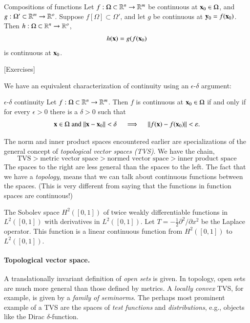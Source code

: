 \begin{myTheorem}{Compositions of functions}{}
Let $f : \Omega \subset \mathbb{R}^n \to \mathbb{R}^m$ be continuous at $\mathbf{x}_0\in \Omega$, and $g : \Omega' \subset \mathbb{R}^m \to \mathbb{R}^o$. Suppose $f[\Omega] \subset \Omega'$, and let $g$ be continuous at $\mathbf{y}_0 = f(\mathbf{x}_0)$. Then $h : \Omega\subset \mathbb{R}^n\to\mathbb{R}^o$,
\[ h(\mathbf{x}) = g(f(\mathbf{x}_0) \]
is continuous at $\mathbf{x}_0$.
\end{myTheorem}

[Exercises]

We have an equivalent characterization of continuity using an $\epsilon$-$\delta$ argument:
\begin{myTheorem}{$\epsilon$-$\delta$ continuity}{}
    Let $f : \Omega \subset \mathbb{R}^n \to \mathbb{R}^m$. Then $f$ is continuous at $\mathbf{x}_0 \in \Omega$ if and only if for every $\epsilon>0$ there is a $\delta > 0$ such that
    \begin{equation}
        \mathbf{x}\in\Omega \; \text{and} \; \|\mathbf{x}-\mathbf{x}_0\| < \delta \quad \implies \quad \|f(\mathbf{x}) - f(\mathbf{x}_0) \| < \varepsilon. 
    \end{equation}
\end{myTheorem}









The norm and inner product spaces encountered earlier are specializations of the general concept of \emph{topological vector spaces (TVS)}. We have the chain,
\begin{equation*}
\text{TVS} > \text{metric vector space} > \text{normed vector space} > \text{inner product space} 
\end{equation*}
The spaces to the right are less general than the spaces to the left. The fact that we have a \emph{topology}, means that we can talk about continuous functions between the spaces. (This is very different from saying that the functions in function spaces are continuous!)

\begin{myExample}{}{}
The Sobolev space $H^2([0,1])$ of twice weakly differentiable functions in $L^2([0,1])$ with derivatives in $L^2([0,1])$. Let $T = -\frac{1}{2}\partial^2/\partial x^2$ be the Laplace operator. This function is a linear continuous function from $H^2([0,1])$ to $L^2([0,1])$.
\end{myExample}

\paragraph{Topological vector space.} A translationally invariant definition of \emph{open sets} is given. In topology, open sets are much more general than those defined by metrics. A \emph{locally convex} TVS, for example, is given by a \emph{family of seminorms}. The perhaps most prominent example of a TVS are the spaces of \emph{test functions} and \emph{distributions}, e.g., objects like the Dirac $\delta$-function.

